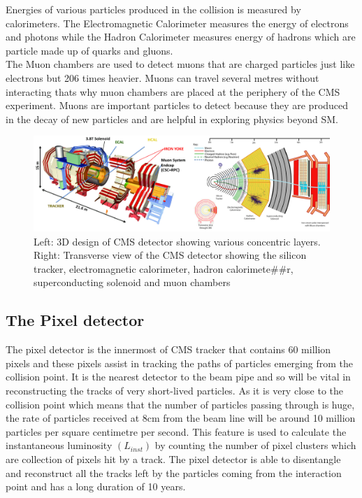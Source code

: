 Energies of various particles produced in the collision is measured by calorimeters. The Electromagnetic Calorimeter measures the energy of electrons and photons while the Hadron Calorimeter measures energy of hadrons which are particle made up of quarks and gluons. \\

The Muon chambers are used to detect muons that are charged particles just like electrons but 206 times heavier. Muons can travel several metres without interacting thats why muon chambers are placed at the periphery of the CMS experiment. Muons are important particles to detect because they are produced in the decay of new particles and are helpful in exploring physics beyond SM.



\begin{figure}[H]
  \centering
  \includegraphics[width=1\columnwidth]{./cmsdetector_merged.png}
  \caption{Left: 3D design of CMS detector showing various concentric layers. Right: \onehalfspacing Transverse view of the CMS detector showing the silicon tracker, electromagnetic calorimeter, hadron calorimete##r, superconducting solenoid and muon chambers \cite{Chatrchyan:2008aa}}
  \label{fig:CMSdetector}
\end{figure}





\subsection{The Pixel detector}

The pixel detector is the innermost of CMS tracker that contains 60 million pixels and these pixels assist in tracking the paths of particles emerging from the collision point. It is the nearest detector to the beam pipe and so will be vital in reconstructing the tracks of very short-lived particles. As it is very close to the collision point which means that the number of particles passing through is huge, the rate of particles received at 8cm from the beam line will be around 10 million particles per square centimetre per second. This feature is used to calculate the instantaneous luminosity $(L_{inst})$ by counting the number of pixel clusters which are collection of pixels hit by a track. The pixel detector is able to disentangle and reconstruct all the tracks left by the particles coming from the interaction point and has a long duration of 10 years. \\


